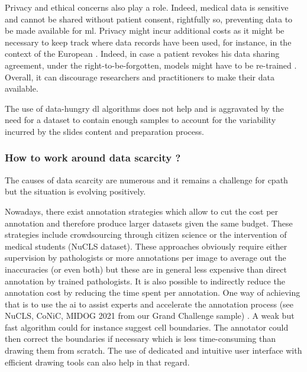 Privacy and ethical concerns also play a role. Indeed, medical data is sensitive and cannot be shared without patient consent, rightfully so, preventing data to be made available for \acrlong{ml}. Privacy might incur additional costs as it might be necessary to keep track where data records have been used, for instance, in the context of the European . Indeed, in case a patient revokes his data sharing agreement, under the right-to-be-forgotten, models might have to be re-trained \cite{humerick2017taking}. Overall, it can discourage researchers and practitioners to make their data available. 

The use of data-hungry \acrlong{dl} algorithms does not help and is aggravated by the need for a dataset to contain enough samples to account for the variability incurred by the slides content and preparation process. 


\subsubsection{How to work around data scarcity ?}
\label{sssec:backdp:ds-solutions}

The causes of data scarcity are numerous and it remains a challenge for \acrlong{cpath} but the situation is evolving positively. 

Nowadays, there exist annotation strategies which allow to cut the cost per annotation and therefore produce larger datasets given the same budget. These strategies include crowdsourcing through citizen science \cite{peplow2016citizen} or the intervention of medical students (\eg NuCLS dataset). These approaches obviously require either supervision by pathologists or more annotations per image to average out the inaccuracies (or even both) but these are in general less expensive than direct annotation by trained pathologists. It is also possible to indirectly reduce the annotation cost by reducing the time spent per annotation. One way of achieving that is to use the \acrshort{ai} to assist experts and accelerate the annotation process (see NuCLS, CoNiC, MIDOG 2021 from our Grand Challenge sample) \cite{chai2020human}. A weak but fast algorithm could for instance suggest cell boundaries. The annotator could then correct the boundaries if necessary which is less time-consuming than drawing them from scratch. The use of dedicated and intuitive user interface with efficient drawing tools can also help in that regard.  

